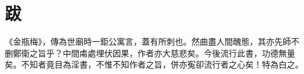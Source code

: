 \chapter*{跋}


《金瓶梅》，傳為世廟時一鉅公寓言，蓋有所刺也。然曲盡人間醜態，其亦先師不删鄭衛之旨乎？中間䖏處埋伏因果，作者亦大慈悲矣。今後流行此書，功德無量矣。不知者竟目為淫書，不惟不知作者之旨，併亦寃卻流行者之心矣！特為白之。

\begin{quotation}
\end{quotation}

